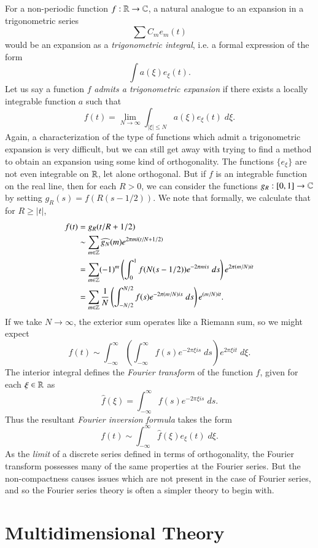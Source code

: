 For a non-periodic function $f: \operatorname{\mathbb{R}} \to \operatorname{\mathbb{C}}$, a natural analogue to an expansion in a trigonometric series
%
\[ \sum C_m e_m(t) \]
%
would be an expansion as a \emph{trigonometric integral}, i.e. a formal expression of the form
%
\[ \int a(\xi) e_\xi(t). \]
%
Let us say a function $f$ \emph{admits a trigonometric expansion} if there exists a locally integrable function $a$ such that
%
\[ f(t) = \lim_{N \to \infty} \int_{|\xi| \leq N} a(\xi) e_\xi(t)\; d\xi. \]
%
Again, a characterization of the type of functions which admit a trigonometric expansion is very difficult, but we can still get away with trying to find a method to obtain an expansion using some kind of orthogonality. The functions $\{ e_\xi \}$ are not even integrable on $\operatorname{\mathbb{R}}$, let alone orthogonal. But if $f$ is an integrable function on the real line, then for each $R > 0$, we can consider the functions $g_R: [0,1] \to \operatorname{\mathbb{C}}$ by setting $g_R(s) = f(R(s-1/2))$. We note that formally, we calculate that for $R \geq |t|$,
%
\begin{align*}
    f(t) &= g_R(t / R + 1/2)\\
    &\sim \sum_{m \in \operatorname{\mathbb{Z}}} \widehat{g_N}(m) e^{2 \pi m i (t/N + 1/2)}\\
    &=  \sum_{m \in \operatorname{\mathbb{Z}}} (-1)^m \left( \int_0^1 f(N(s-1/2)) e^{-2 \pi mis}\; ds \right) e^{2 \pi (m/N) it}\\
    &= \sum_{m \in \operatorname{\mathbb{Z}}} \frac{1}{N} \left( \int_{-N/2}^{N/2} f(s) e^{-2\pi (m/N) i s}\; ds \right) e^{(m/N)it}.
\end{align*}
%
If we take $N \to \infty$, the exterior sum operates like a Riemann sum, so we might expect
%
\[ f(t) \sim \int_{-\infty}^\infty \left( \int_{-\infty}^\infty f(s) e^{-2 \pi \xi is}\; ds \right) e^{2 \pi \xi i t}\; d\xi. \]
%
The interior integral defines the \emph{Fourier transform} of the function $f$, given for each $\xi \in \operatorname{\mathbb{R}}$ as
%
\[ \widehat{f}(\xi) = \int_{-\infty}^\infty f(s) e^{- 2 \pi \xi is}\; ds. \]
%
Thus the resultant \emph{Fourier inversion formula} takes the form
%
\[ f(t) \sim \int_{-\infty}^\infty \widehat{f}(\xi) e_\xi(t)\; d\xi. \]
%
As the \emph{limit} of a discrete series defined in terms of orthogonality, the Fourier transform possesses many of the same properties at the Fourier series. But the non-compactness causes issues which are not present in the case of Fourier series, and so the Fourier series theory is often a simpler theory to begin with.

\section{Multidimensional Theory}

